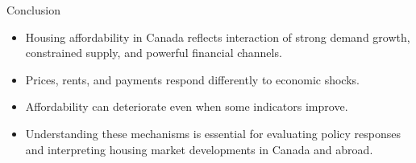 \documentclass[aspectratio=169]{beamer}
\begin{document}
\begin{frame}{Conclusion}
\transfade
\begin{itemize}
  \item Housing affordability in Canada reflects interaction of strong demand growth, constrained supply, and powerful financial channels.
  \item Prices, rents, and payments respond differently to economic shocks.
  \item Affordability can deteriorate even when some indicators improve.
  \item Understanding these mechanisms is essential for evaluating policy responses and interpreting housing market developments in Canada and abroad.
\end{itemize}
\end{frame}
\end{document}
